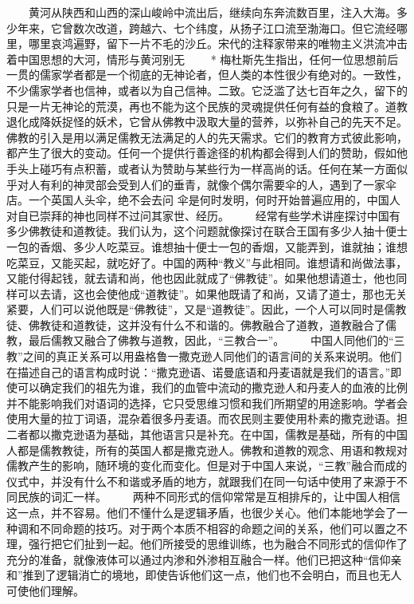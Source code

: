 \documentclass[12pt,oneside]{book}
\begin{document}
\begin{common-format}
　　黄河从陕西和山西的深山峻岭中流出后，继续向东奔流数百里，注入大海。多少年来，它曾数次改道，跨越六、七个纬度，从扬子江口流至渤海口。但它流经哪里，哪里哀鸿遍野，留下一片不毛的沙丘。宋代的注释家带来的唯物主义洪流冲击着中国思想的大河，情形与黄河别无 
　　* 梅杜斯先生指出，任何一位思想前后一贯的儒家学者都是一个彻底的无神论者，但人类的本性很少有绝对的。一致性，不少儒家学者也信神，或者以为自己信神。二致。它泛滥了达七百年之久，留下的只是一片无神论的荒漠，再也不能为这个民族的灵魂提供任何有益的食粮了。道教退化成降妖捉怪的妖术，它曾从佛教中汲取大量的营养，以弥补自己的先天不足。佛教的引入是用以满足儒教无法满足的人的先天需求。它们的教育方式彼此影响，都产生了很大的变动。任何一个提供行善途径的机构都会得到人们的赞助，假如他手头上碰巧有点积蓄，或者认为赞助与某些行为一样高尚的话。任何在某一方面似乎对人有利的神灵部会受到人们的垂青，就像个偶尔需要伞的人，遇到了一家伞店。一个英国人头伞，绝不会去问 伞是何时发明，何时开始普遍应用的，中国人对自已崇拜的神也同样不过问其家世、经历。 
　　经常有些学术讲座探讨中国有多少佛教徒和道教徒。我们认为，这个问题就像探讨在联合王国有多少人抽十便士一包的香烟、多少人吃菜豆。谁想抽十便士一包的香烟，又能弄到，谁就抽；谁想吃菜豆，又能买起，就吃好了。中国的两种“教义”与此相同。谁想请和尚做法事，又能付得起钱，就去请和尚，他也因此就成了“佛教徒”。如果他想请道士，他也同样可以去请，这也会使他成“道教徒”。如果他既请了和尚，又请了道士，那也无关紧要，人们可以说他既是“佛教徒”，又是“道教徒”。因此，一个人可以同时是儒教徒、佛教徒和道教徒，这并没有什么不和谐的。佛教融合了道教，道教融合了儒教，最后儒教又融合了佛教与道教，因此，“三教合一”。 
　　中国人同他们的“三教”之间的真正关系可以用盎格鲁一撒克逊人同他们的语言间的关系来说明。他们在描述自己的语言构成时说：“撒克逊语、诺曼底语和丹麦语就是我们的语言。”即使可以确定我们的祖先为谁，我们的血管中流动的撒克逊人和丹麦人的血液的比例并不能影响我们对语词的选择，它只受思维习惯和我们所期望的用途影响。学者会使用大量的拉丁词语，混杂着很多丹麦语。而农民则主要使用朴素的撒克逊语。担二者都以撒克逊语为基础，其他语言只是补充。在中国，儒教是基础，所有的中国人都是儒教教徒，所有的英国人都是撒克逊人。佛教和道教的观念、用语和教规对儒教产生的影响，随环境的变化而变化。但是对于中国人来说，“三教”融合而成的仪式中，并没有什么不和谐或矛盾的地方，就跟我们在同一句话中使用了来源于不同民族的词汇一样。 
　　两种不同形式的信仰常常是互相排斥的，让中国人相信这一点，并不容易。他们不懂什么是逻辑矛盾，也很少关心。他们本能地学会了一种调和不同命题的技巧。对于两个本质不相容的命题之间的关系，他们可以置之不理，强行把它们扯到一起。他们所接受的思维训练，也为融合不同形式的信仰作了充分的准备，就像液体可以通过内渗和外渗相互融合一样。他们已把这种“信仰亲和”推到了逻辑消亡的境地，即使告诉他们这一点，他们也不会明白，而且也无人可使他们理解。 

\end{common-format}
\end{document}
